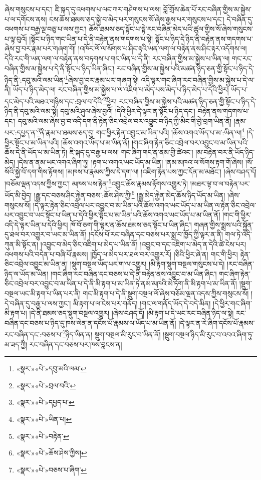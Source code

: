 ཞེས་གསུངས་པ་དང་། ཇི་སྐད་དུ་འཕགས་པ་ལང་ཀར་གཤེགས་པ་ལས། བློ་གྲོས་ཆེན་པོ་རང་བཞིན་གྱིས་མ་སྐྱེས་པ་ལ་དགོངས་ནས། ངས་ཆོས་ཐམས་ཅད་སྐྱེ་བ་མེད་པར་གསུངས་སོ་ཞེས་རྒྱས་པར་གསུངས་པ་དང་། དེ་བཞིན་དུ་འཕགས་པ་བརྒྱ་ལྔ་བཅུ་པ་ལས་ཀྱང་། ཆོས་ཐམས་ཅད་སྟོང་པ་སྟེ་རང་བཞིན་མེད་པའི་ཚུལ་གྱིས་སོ་ཞེས་གསུངས་པ་ལྟ་བུའོ། །སྟོང་པ་ཉིད་གང་ཡིན་པ་དེ་ནི་བརྟེན་ནས་གདགས་པ་སྟེ། སྟོང་པ་ཉིད་དེ་ཉིད་ནི་བརྟེན་ནས་གདགས་པ་ཞེས་བྱ་བར་རྣམ་པར་གཞག་གོ། །འཁོར་ལོ་ལ་སོགས་པ་ཤིང་རྟའི་ཡན་ལག་ལ་བརྟེན་ནས་ཤིང་རྟར་འདོགས་ལ། དེའི་རང་གི་ཡན་ལག་ལ་བརྟེན་ནས་བཏགས་པ་གང་ཡིན་པ་དེ་ནི། རང་བཞིན་གྱིས་མ་སྐྱེས་པ་ཡིན་ལ། གང་རང་བཞིན་གྱིས་མ་སྐྱེས་པ་དེ་ནི་སྟོང་པ་ཉིད་ཡིན་ཞིང་། རང་བཞིན་གྱིས་མ་སྐྱེས་པའི་མཚན་ཉིད་ཅན་གྱི་སྟོང་པ་ཉིད་དེ་ཉིད་ནི་:དབུ་མའི་ལམ་ཡིན་\footnote{«སྣར་»«པེ་»དབུ་མའི་ལམ་}ཞེས་བྱ་བར་རྣམ་པར་གཞག་སྟེ། འདི་ལྟར་གང་ཞིག་རང་བཞིན་གྱིས་མ་སྐྱེས་པ་དེ་ལ་ནི། ཡོད་པ་ཉིད་མེད་ལ། རང་བཞིན་གྱིས་མ་སྐྱེས་པ་ལ་འཇིག་པ་མེད་པས་མེད་པ་ཉིད་མེད་པ་དེའི་ཕྱིར། ཡོད་པ་དང་མེད་པའི་མཐའ་གཉིས་དང་:བྲལ་བ་དེའི་\footnote{«སྣར་»«པེ་»བྲལ་བའི་}ཕྱིར། རང་བཞིན་གྱིས་མ་སྐྱེས་པའི་མཚན་ཉིད་ཅན་གྱི་སྟོང་པ་ཉིད་དེ་ཉིད་ནི་དབུ་མའི་ལམ་སྟེ། དབུ་མའི་ཤུལ་ཞེས་བྱའོ། །དེའི་ཕྱིར་དེ་ལྟར་ན་སྟོང་པ་ཉིད་དང་། བརྟེན་ནས་གདགས་པ་དང་། དབུ་མའི་ལམ་ཞེས་བྱ་བ་འདི་དག་ནི་རྟེན་ཅིང་འབྲེལ་བར་འབྱུང་བ་ཉིད་ཀྱི་མིང་གི་བྱེ་བྲག་ཡིན་ནོ། །རྣམ་པར་:དཔྱད་ན་\footnote{«སྣར་»«པེ་»དཔྱད་པ་}ནི་རྣམ་པ་ཐམས་ཅད་དུ། གང་ཕྱིར་རྟེན་འབྱུང་མ་ཡིན་པའི། །ཆོས་འགའ་ཡོད་པ་མ་:ཡིན་ལ།\footnote{«སྣར་»«པེ་»ཡིན་པ།} །དེ་ཕྱིར་སྟོང་པ་མ་ཡིན་པའི། །ཆོས་འགའ་ཡོད་པ་མ་ཡིན་ནོ། །གང་ཞིག་རྟེན་ཅིང་འབྲེལ་བར་འབྱུང་བ་མ་ཡིན་པའི་ཆོས་དེ་ནི་ཡོད་པ་མ་ཡིན་ཏེ། ཇི་སྐད་དུ་བརྒྱ་པ་ལས། གང་ཞིག་གང་ན་ནམ་གྱི་ཚེའང་། །མ་བརྟེན་བར་ནི་ཡོད་ཉིད་མེད། །དེས་ན་ནམ་ཡང་འགའ་ཞིག་ཏུ། །རྟག་པ་འགའ་ཡང་ཡོད་མ་ཡིན། །ནམ་མཁའ་ལ་སོགས་རྟག་གོ་ཞེས། །སོ་སོའི་སྐྱེ་བོ་དག་གིས་རྟོགས། །མཁས་པ་རྣམས་ཀྱིས་དེ་དག་ལ། །འཇིག་རྟེན་པས་ཀྱང་དོན་མ་མཐོང་། །ཞེས་བཤད་དོ། །བཅོམ་ལྡན་འདས་ཀྱིས་ཀྱང་། མཁས་པས་རྟེན་\footnote{«སྣར་»«པེ་»བརྟེན་}འབྱུང་ཆོས་རྣམས་རྟོགས་འགྱུར་ཏེ། །མཐར་ལྟ་བ་ལ་བརྟེན་པར་ཡོད་མི་བྱེད། །རྒྱུ་དང་བཅས་ཤིང་རྐྱེན་བཅས་:ཆོས་ཤེས་ཀྱི།\footnote{«སྣར་»«པེ་»ཆོས་ཤེས་ཀྱིས།} །རྒྱུ་མེད་རྐྱེན་མེད་ཆོས་ཉིད་ཡོད་མ་ཡིན། །ཞེས་གསུངས་སོ། །དེ་ལྟར་རྟེན་ཅིང་འབྲེལ་པར་འབྱུང་བ་མ་ཡིན་པའི་ཆོས་འགའ་ཡང་ཡོད་པ་མ་ཡིན་ལ་རྟེན་ཅིང་འབྲེལ་པར་འབྱུང་བ་ཡང་སྟོང་པ་ཡིན་པ་དེའི་ཕྱིར་སྟོང་པ་མ་ཡིན་པའི་ཆོས་འགའ་ཡང་ཡོད་པ་མ་ཡིན་ནོ། །གང་གི་ཕྱིར་འདི་དེ་ལྟར་ཡིན་པ་དེའི་ཕྱིར། ཁོ་བོ་ཅག་གི་ལྟར་ན་ཆོས་ཐམས་ཅད་སྟོང་པ་ཡིན་ཞིང་། གཞན་གྱིས་སྨྲས་པའི་སྐྱོན་དུ་ཐལ་བར་འགྱུར་བ་ཡང་མ་ཡིན་ནོ། །དངོས་པོ་རང་བཞིན་དང་བཅས་པར་སྨྲ་བ་ཁྱོད་ཀྱི་ལྟར་ན་ནི། གལ་ཏེ་འདི་ཀུན་མི་སྟོང་ན། །འབྱུང་བ་མེད་ཅིང་འཇིག་པ་མེད་པ་ཡིན་ནོ། །འབྱུང་བ་དང་འཇིག་པ་མེད་ན་དེའི་ཚེ་ངེས་པར། འཕགས་པའི་བདེན་པ་བཞི་པོ་རྣམས། །ཁྱོད་ལ་མེད་པར་ཐལ་བར་འགྱུར་རོ། །ཅིའི་ཕྱིར་ཞེ་ན། གང་གི་ཕྱིར། རྟེན་ཅིང་འབྲེལ་འབྱུང་མ་ཡིན་ན། །སྡུག་བསྔལ་ཡོད་པར་ག་ལ་འགྱུར། །མི་རྟག་སྡུག་བསྔལ་གསུངས་པ་དེ། །རང་བཞིན་ཉིད་ལ་ཡོད་མ་ཡིན། །གང་ཞིག་རང་བཞིན་དང་བཅས་པ་དེ་ནི་བརྟེན་ནས་འབྱུང་བ་མ་ཡིན་ཞིང་། གང་ཞིག་རྟེན་ཅིང་འབྲེལ་བར་འབྱུང་བ་མ་ཡིན་པ་དེ་ནི་མི་རྟག་པ་མ་ཡིན་ཏེ་ནམ་མཁའི་མེ་ཏོག་ནི་མི་རྟག་པ་མ་ཡིན་ནོ། །སྡུག་བསྔལ་ཡང་མི་རྟག་པ་ཡིན་པར་ནི། གང་མི་རྟག་པ་དེ་ནི་སྡུག་བསྔལ་ལོ་ཞེས་བཅོམ་ལྡན་འདས་ཀྱིས་གསུངས་སོ། །དེ་བཞིན་དུ་བརྒྱ་པ་ལས་ཀྱང་། མི་རྟག་པ་ལ་ངེས་པར་གནོད། །གང་ལ་གནོད་ཡོད་དེ་བདེ་མིན། །དེ་ཕྱིར་གང་ཞིག་མི་རྟག་པ། །དེ་ནི་ཐམས་ཅད་སྡུག་བསྔལ་འགྱུར། །ཞེས་བཤད་དོ། །མི་རྟག་པ་དེ་ཡང་རང་བཞིན་ཉིད་ལ་སྟེ། རང་བཞིན་དང་བཅས་པ་ཉིད་དུ་ཁས་ལེན་ན་དངོས་པོ་རྣམས་ལ་ཡོད་པ་མ་ཡིན་ནོ། །དེ་ལྟར་ན་རེ་ཞིག་དངོས་པོ་རྣམས་རང་བཞིན་དང་:བཅས་པ་\footnote{«སྣར་»«པེ་»བཅས་པ་ཞིག་}ཉིད་ཡིན་ན། སྡུག་བསྔལ་མི་རུང་བ་ཡིན་ནོ། །སྡུག་བསྔལ་ཉིད་མི་རུང་བ་འབའ་ཞིག་ཏུ་མ་ཟད་ཀྱི། རང་བཞིན་དང་བཅས་པར་ཁས་བླངས་ན། 